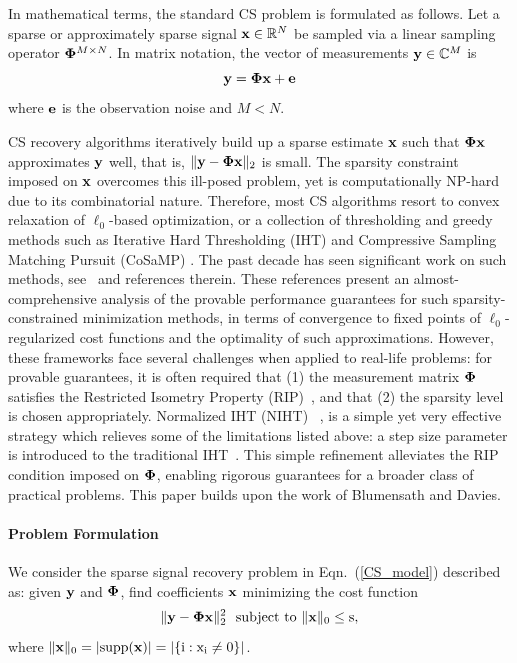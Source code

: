 \documentclass{article}
\begin{document}
In mathematical terms, the standard CS problem is formulated as follows. Let a sparse or approximately sparse signal ${\bf x}\in \mathbb{R}^N$ be sampled via a linear sampling operator ${\bf \Phi}^{M\times N}$. In matrix notation, the vector of measurements ${\bf y} \in \mathbb{C}^M$ is
\begin{equation}\label{CS_model}
 {\bf y} =  {\bf \Phi}  {\bf x} + {\bf e}
\end{equation}
where ${\bf e}$ is the observation noise and $M < N$.

CS recovery algorithms iteratively build up a sparse estimate ${\bf x}$ such that ${\bf \Phi}  {\bf x}$ approximates ${\bf y}$ well, that is,  $\| {\bf y}- {\bf \Phi}  {\bf x} \|_2$ is small. The sparsity constraint imposed on ${\bf x}$ overcomes this ill-posed problem, yet is computationally NP-hard due to its combinatorial nature. 
Therefore, most CS algorithms resort to convex relaxation of $\ell_0$-based optimization, or a collection of thresholding and greedy methods such as Iterative Hard Thresholding (IHT) \cite{blumensath2008iht, blumensath2009iht} and Compressive Sampling Matching Pursuit (CoSaMP) \cite{needel2008cosamp}. The past decade has seen significant work on such methods, see~\cite{liu2017dualiht, yuan2014ht, yuan2016htp, blumensath2013cs, needel2008cosamp} and references therein. These references present an almost-comprehensive analysis of the provable performance guarantees for such sparsity-constrained minimization methods, in terms of convergence to fixed points of $\ell_0$-regularized cost functions and the optimality of such approximations. However, these frameworks face several challenges when applied to real-life problems: for provable guarantees, it is often required that (1) the measurement matrix ${\bf \Phi}$ satisfies the Restricted Isometry Property (RIP)~\cite{candes2008rip, chartrand2008rip}, and that (2) the sparsity level is chosen appropriately. 
Normalized IHT (NIHT)~ \cite{blumensath2010niht}, is a simple yet very effective strategy  which relieves some of the limitations listed above: a step size parameter is introduced to the traditional IHT~\cite{blumensath2008iht}. This simple refinement alleviates the RIP condition imposed on ${\bf \Phi}$, enabling rigorous guarantees for a broader class of practical problems. {This paper
builds upon the work of Blumensath and Davies.}

\vspace{-1em}
\paragraph*{Problem Formulation}
 We consider the sparse signal recovery problem in Eqn.~(\ref{CS_model}) described as: given ${\bf y}$ and ${\bf \Phi}$, find coefficients ${\bf x}$ minimizing the cost function
 \begin{equation}\label{cost_function}
     \|{\bf y} - {\bf \Phi x} \|_2^2 \ \ \rm{subject \ to \ \|{\bf x} \|_0 \leq s},
 \end{equation}
 where $\|{\bf x} \|_0 = |\rm{supp}({\bf x})| = |\{i: x_i\neq 0 \}|$.
 
\end{document}
